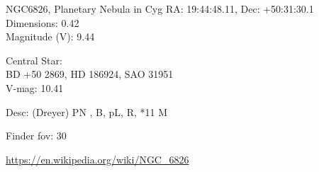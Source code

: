 \begin{block}{NGC6826, Planetary Nebula in Cyg}
    RA: 19:44:48.11, Dec: +50:31:30.1 \\ 
    Dimensions: 0.42 \\ 
    Magnitude (V): 9.44

    Central Star: \\ 
      \hspace{1em}BD +50 2869, HD 186924, SAO 31951 \\ 
      \hspace{1em}V-mag: 10.41 

    Desc: (Dreyer) PN , B, pL, R, *11 M 

    Finder fov: 30 

    \url{https://en.wikipedia.org/wiki/NGC_6826} 
\end{block}